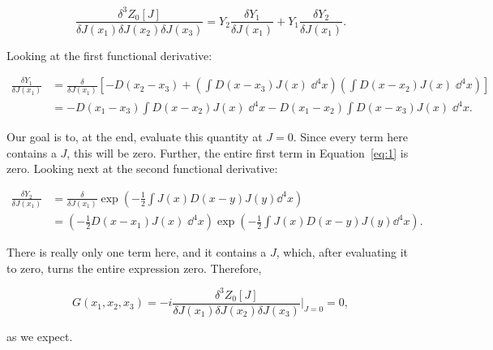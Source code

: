 \documentclass[titlepage]{article}
\begin{document}
\begin{equation}
    \frac{\delta^3 Z_0[J]}{\delta J(x_1) \delta J(x_2) \delta J(x_3)} = Y_2 \frac{\delta Y_1}{\delta J(x_1)} + Y_1 \frac{\delta Y_2}{\delta J(x_1)}.\label{eq:1}
\end{equation}

Looking at the first functional derivative:

\begin{align}
    \frac{\delta Y_1}{\delta J(x_1)} &= \frac{\delta}{\delta J(x_1)} \left[ -D(x_2 - x_3) + \left( \int D(x-x_3) J(x) \;\dd^4x \right)\left( \int D(x-x_2) J(x) \;\dd^4x \right) \right] \\
    &= -D(x_1 - x_3)\int D(x-x_2) J(x) \;\dd^4x - D(x_1 - x_2)\int D(x-x_3) J(x) \;\dd^4x.
\end{align}

Our goal is to, at the end, evaluate this quantity at $J=0$. Since every term here contains a $J$, this will be zero. Further, the entire first term in Equation~\eqref{eq:1} is zero. Looking next at the second functional derivative:

\begin{align}
    \frac{\delta Y_2}{\delta J(x_1)} &= \frac{\delta}{\delta J(x_1)} \exp\left( -\frac{1}{2}\int J(x)D(x-y)J(y) \dd^4x \right) \\
    &= \left( -\frac{1}{2}D(x-x_1)J(x)\;\dd^4x \right) \exp\left( -\frac{1}{2}\int J(x)D(x-y)J(y) \dd^4x \right).
\end{align}

There is really only one term here, and it contains a $J$, which, after evaluating it to zero, turns the entire expression zero. Therefore,

\begin{equation}
    G(x_1,x_2,x_3) = -i \frac{\delta^3 Z_0[J]}{\delta J(x_1) \delta J(x_2) \delta J(x_3)}\bigg|_{J=0} = 0,
\end{equation}

as we expect.
\end{document}
